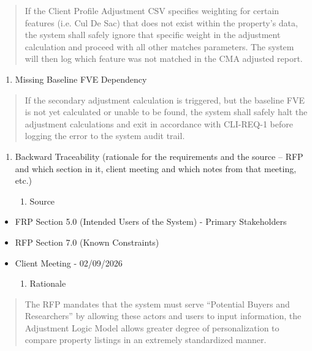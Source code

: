 \documentclass[
]{article}
\begin{document}
\begin{quote}
If the Client Profile Adjustment CSV specifies weighting for certain
features (i.e. Cul De Sac) that does not exist within the property's
data, the system shall safely ignore that specific weight in the
adjustment calculation and proceed with all other matches parameters.
The system will then log which feature was not matched in the CMA
adjusted report.
\end{quote}

\begin{enumerate}
\def\labelenumi{\roman{enumi}.}
\setcounter{enumi}{1}
\item
  Missing Baseline FVE Dependency
\end{enumerate}

\begin{quote}
If the secondary adjustment calculation is triggered, but the baseline
FVE is not yet calculated or unable to be found, the system shall safely
halt the adjustment calculations and exit in accordance with CLI-REQ-1
before logging the error to the system audit trail.
\end{quote}

\begin{enumerate}
\def\labelenumi{\alph{enumi}.}
\setcounter{enumi}{1}
\item
  Backward Traceability (rationale for the requirements and the source
  -- RFP and which section in it, client meeting and which notes from
  that meeting, etc.)

  \begin{enumerate}
  \def\labelenumii{\roman{enumii}.}
  \item
    Source
  \end{enumerate}
\end{enumerate}

\begin{itemize}
\item
  FRP Section 5.0 (Intended Users of the System) - Primary Stakeholders
\item
  RFP Section 7.0 (Known Constraints)
\item
  Client Meeting - 02/09/2026

  \begin{enumerate}
  \def\labelenumi{\roman{enumi}.}
  \item
    Rationale
  \end{enumerate}
\end{itemize}

\begin{quote}
The RFP mandates that the system must serve ``Potential Buyers and
Researchers'' by allowing these actors and users to input information,
the Adjustment Logic Model allows greater degree of personalization to
compare property listings in an extremely standardized manner.
\end{quote}
\end{document}
